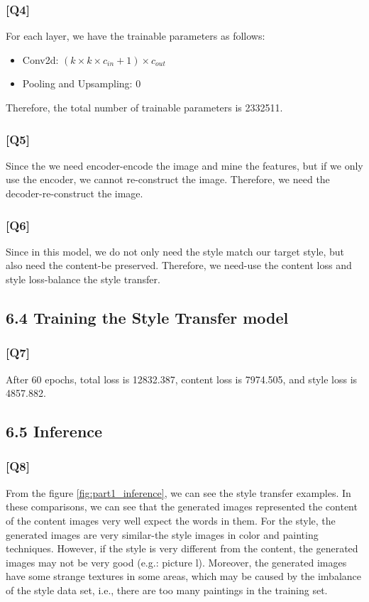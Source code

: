 \documentclass{article}
\begin{document}
\subsubsection*{[Q4]}
For each layer, we have the trainable parameters as follows:
\begin{itemize}
    \item Conv2d: $(k \times k \times c_{in} + 1) \times c_{out}$
    \item Pooling and Upsampling: 0
\end{itemize}

Therefore, the total number of trainable parameters is 2332511.

\subsubsection*{[Q5]}
Since the we need encoder-encode the image and mine the features, but if we only use the encoder, we cannot re-construct the image. 
Therefore, we need the decoder-re-construct the image.

\subsubsection*{[Q6]}
Since in this model, we do not only need the style match our target style, but also need the content-be preserved.
Therefore, we need-use the content loss and style loss-balance the style transfer.

\subsection*{6.4 Training the Style Transfer model}

\subsubsection*{[Q7]}

After 60 epochs, total loss is 12832.387, content loss is 7974.505, and style loss is 4857.882.

\subsection*{6.5 Inference}

\subsubsection*{[Q8]}

From the figure \ref{fig:part1_inference}, we can see the style transfer examples.
In these comparisons, we can see that the generated images represented the content of the content images very well expect the words in them.
For the style, the generated images are very similar-the style images in color and painting techniques.
However, if the style is very different from the content, the generated images may not be very good (e.g.: picture l).
Moreover, the generated images have some strange textures in some areas, which may be caused by the imbalance of the style data set, i.e., there are too many paintings in the training set.
\end{document}

